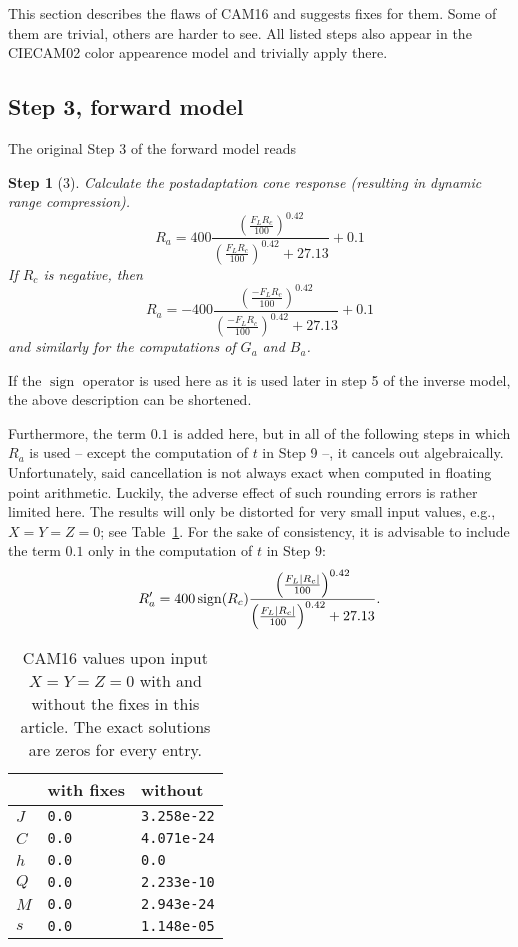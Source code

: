 \documentclass[twocolumn]{scrartcl}
\theoremstyle{named}
\newtheorem*{step}{Step}
\DeclarePairedDelimiter\abs{\lvert}{\rvert}%
\DeclareMathOperator{\sign}{sign}
\begin{document}
This section describes the flaws of CAM16 and suggests fixes for them. Some of
them are trivial, others are harder to see. All listed steps also appear in the
CIECAM02 color appearence model and trivially apply there.

\subsection{Step 3, forward model}

The original Step 3 of the forward model reads

\begin{step}[3]
Calculate the postadaptation cone response
(resulting in dynamic range compression).
\[
  R_a = 400 \frac{\left(\frac{F_L R_c}{100}\right)^{0.42}}{\left(\frac{F_L R_c}{100}\right)^{0.42} + 27.13} + 0.1
\]
If $R_c$ is negative, then
\[
  R_a = -400 \frac{\left(\frac{-F_L R_c}{100}\right)^{0.42}}{\left(\frac{-F_L R_c}{100}\right)^{0.42} + 27.13} + 0.1
\]
and similarly for the computations of $G_a$ and $B_a$.
\end{step}

If the $\sign$ operator is used here as it is used later in step 5 of the
inverse model, the above description can be shortened.

Furthermore, the term $0.1$ is added here, but in all of the following steps in
which $R_a$ is used -- except the computation of $t$ in Step 9 --, it cancels
out algebraically.  Unfortunately, said cancellation is not always exact when
computed in floating point arithmetic. Luckily, the adverse effect of such
rounding errors is rather limited here. The results will only be distorted for
very small input values, e.g., $X=Y=Z=0$; see Table~\ref{tab:zero}. For the
sake of consistency, it is advisable to include the term $0.1$ only in the
computation of $t$ in Step 9:
\[
  R'_a = 400 \sign(R_c) \frac{{\left(\frac{F_L \abs{R_c}}{100}\right)}^{0.42}}{{\left(\frac{F_L \abs{R_c}}{100}\right)}^{0.42} + 27.13}.
\]


\begin{table}\centering
  \begin{tabularx}{\linewidth}{XXX}
  \toprule
          & with fixes & without\\
  \midrule
    $J$ & \texttt{0.0} & \texttt{3.258e-22}\\
    $C$ & \texttt{0.0} & \texttt{4.071e-24}\\
    $h$ & \texttt{0.0} & \texttt{0.0}\\
    $Q$ & \texttt{0.0} & \texttt{2.233e-10}\\
    $M$ & \texttt{0.0} & \texttt{2.943e-24}\\
    $s$ & \texttt{0.0} & \texttt{1.148e-05}\\
  \bottomrule
\end{tabularx}
\caption{CAM16 values upon input $X=Y=Z=0$ with and without the fixes in
  this article.  The exact solutions are zeros for every
  entry.}\label{tab:zero}
\end{table}
\end{document}
